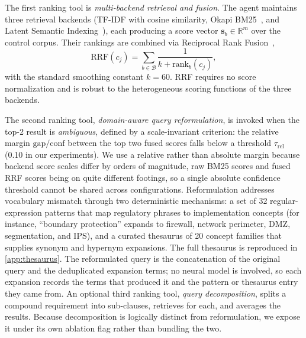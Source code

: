 \documentclass[a4paper,fleqn]{cas-sc}
\begin{document}
The first ranking tool is \emph{multi-backend retrieval and fusion}.
The agent maintains three retrieval backends (TF-IDF with cosine similarity, Okapi BM25~\citep{Robertson2009}, and Latent Semantic Indexing~\citep{MarcusMaletic2003}), each producing a score vector $\mathbf{s}_b \in \mathbb{R}^m$ over the control corpus.
Their rankings are combined via Reciprocal Rank Fusion~\citep{Cormack2009},
\begin{equation}
\text{RRF}(c_j) = \sum_{b \in \mathcal{B}} \frac{1}{k + \text{rank}_b(c_j)},
\end{equation}
with the standard smoothing constant $k = 60$.
RRF requires no score normalization and is robust to the heterogeneous scoring functions of the three backends.

The second ranking tool, \emph{domain-aware query reformulation}, is invoked when the top-2 result is \emph{ambiguous}, defined by a scale-invariant criterion: the relative margin $\text{gap}/\text{conf}$ between the top two fused scores falls below a threshold $\tau_{\text{rel}}$ (0.10 in our experiments). We use a relative rather than absolute margin because backend score scales differ by orders of magnitude, raw BM25 scores and fused RRF scores being on quite different footings, so a single absolute confidence threshold cannot be shared across configurations. Reformulation addresses vocabulary mismatch through two deterministic mechanisms: a set of 32 regular-expression patterns that map regulatory phrases to implementation concepts (for instance, ``boundary protection'' expands to firewall, network perimeter, DMZ, segmentation, and IPS), and a curated thesaurus of 20 concept families that supplies synonym and hypernym expansions.
The full thesaurus is reproduced in \ref{app:thesaurus}.
The reformulated query is the concatenation of the original query and the deduplicated expansion terms; no neural model is involved, so each expansion records the terms that produced it and the pattern or thesaurus entry they came from.
An optional third ranking tool, \emph{query decomposition}, splits a compound requirement into sub-clauses, retrieves for each, and averages the results. Because decomposition is logically distinct from reformulation, we expose it under its own ablation flag rather than bundling the two.
\end{document}
